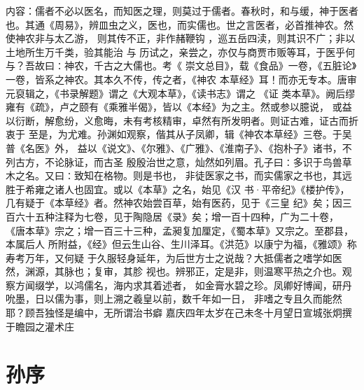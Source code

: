\documentclass[12pt,UTF8]{ctexbook}
\begin{document}
内容：儒者不必以医名，而知医之理，则莫过于儒者。春秋时，和与缓，神于医者也。其通《周易》，辨皿虫之义，医也，而实儒也。世之言医者，必首推神农。然使神农非与太乙游， 
则其传不正，非作赭鞭钩 ，巡五岳四渎，则其识不广；非以土地所生万千类，验其能治 
与 
历试之，亲尝之，亦仅与商贾市贩等耳，于医乎何与？吾故曰∶神农，千古之大儒也。考《 
崇文总目》，载《食品》一卷，《五脏论》一卷，皆系之神农。其本久不传，传之者，《神农 
本草经》耳！而亦无专本。唐审元裒辑之，《书录解题》谓之《大观本草》，《读书志》谓之 
《证 
类本草》。阙后缪雍有《疏》，卢之颐有《乘雅半偈》，皆以《本经》为之主。然或参以臆说， 
或益以衍断，解愈纷，义愈晦，未有考核精审，卓然有所发明者。则证古难，证古而折衷于 
至是，为尤难。孙渊如观察，偕其从子凤卿，辑《神农本草经》三卷。于吴普《名医》外， 
益以《说文》、《尔雅》、《广雅》、《淮南子》、《抱朴子》诸书，不列古方，不论脉证，而古圣 
殷殷治世之意，灿然如列眉。孔子曰∶多识于鸟兽草木之名。又曰∶致知在格物。则是书也， 
非徒医家之书，而实儒家之书也，其远胜于希雍之诸人也固宜。或以《本草》之名，始见《汉 
书·平帝纪》《楼护传》，几有疑于《本草经》者。然神农始尝百草，始有医药，见于《三皇 
纪》矣；因三百六十五种注释为七卷，见于陶隐居《录》矣；增一百十四种，广为二十卷， 
《唐本草》宗之；增一百三十三种，孟昶复加厘定，《蜀本草》又宗之。至郡县，本属后人 
所附益，《经》但云生山谷、生川泽耳。《洪范》以康宁为福，《雅颂》称寿考万年，又何疑 
于久服轻身延年，为后世方士之说哉？大抵儒者之嗜学如医然，渊源，其脉也；复审，其胗 
视也。辨邪正，定是非，则温寒平热之介也。观察方闻缀学，以鸿儒名，海内求其着述者， 
如金膏水碧之珍。凤卿好博闻，研丹吮墨，日以儒为事，则上溯之羲皇以前，数千年如一日， 
非嗜之专且久而能然耶？顾吾独怪是编中，无所谓治书癖 
嘉庆四年太岁在己未冬十月望日宣城张炯撰于瞻园之灌术庄

\chapter{孙序}
\end{document}
